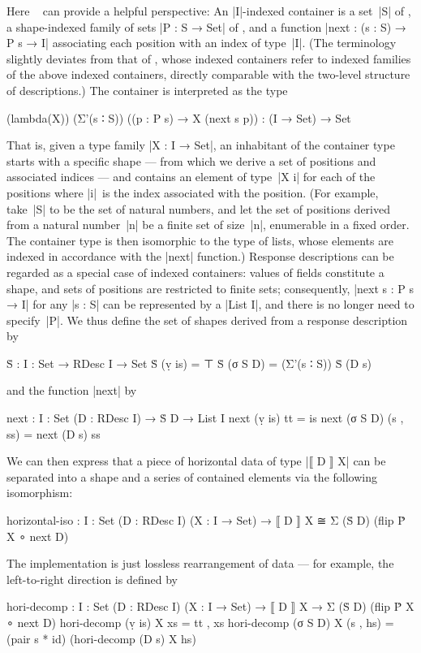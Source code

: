 Here ~\citep[Chapter~8]{Morris-thesis} can provide a helpful perspective:
An |I|-indexed container is a set~|S| of , a shape-indexed family of sets |P : S → Set| of , and a function |next : (s : S) → P s → I| associating each position with an index of type~|I|.
(The terminology slightly deviates from that of \citeauthor{Morris-thesis}, whose indexed containers refer to indexed families of the above indexed containers, directly comparable with the two-level structure of descriptions.)
The container is interpreted as the type
\begin{code}
(lambda(X)) (Σ'(s ∶ S)) ((p : P s) → X (next s p)) : (I → Set) → Set
\end{code}
That is, given a type family |X : I → Set|, an inhabitant of the container type starts with a specific shape --- from which we derive a set of positions and associated indices --- and contains an element of type~|X i| for each of the positions where |i|~is the index associated with the position.
(For example, take~|S| to be the set of natural numbers, and let the set of positions derived from a natural number~|n| be a finite set of size~|n|, enumerable in a fixed order.
The container type is then isomorphic to the type of lists, whose elements are indexed in accordance with the |next| function.)
Response descriptions can be regarded as a special case of indexed containers: values of fields constitute a shape, and sets of positions are restricted to finite sets; consequently, |next s : P s → I| for any |s : S| can be represented by a |List I|, and there is no longer need to specify~|P|.
We thus define the set of shapes derived from a response description by
\begin{code}
Ṡ : {I : Set} → RDesc I → Set
Ṡ (ṿ is)   = ⊤
Ṡ (σ S D)  = (Σ'(s ∶ S)) Ṡ (D s)
\end{code}
and the function |next| by
\begin{code}
next : {I : Set} (D : RDesc I) → Ṡ D → List I
next (ṿ is)   tt        = is
next (σ S D)  (s , ss)  = next (D s) ss
\end{code}
We can then express that a piece of horizontal data of type |⟦ D ⟧ X| can be separated into a shape and a series of contained elements via the following isomorphism:
\begin{code}
horizontal-iso :  {I : Set} (D : RDesc I) (X : I → Set) →
                  ⟦ D ⟧ X ≅ Σ (Ṡ D) (flip Ṗ X ∘ next D)
\end{code}
The implementation is just lossless rearrangement of data --- for example, the left-to-right direction is defined by
\begin{code}
hori-decomp :  {I : Set} (D : RDesc I) (X : I → Set) →
               ⟦ D ⟧ X → Σ (Ṡ D) (flip Ṗ X ∘ next D)
hori-decomp (ṿ is)   X xs        = tt , xs
hori-decomp (σ S D)  X (s , hs)  = (pair s * id) (hori-decomp (D s) X hs)
\end{code}

